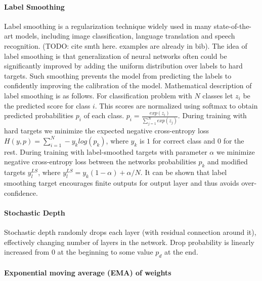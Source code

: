 

\paragraph{Label Smoothing}

Label smoothing is a regularization technique widely used in many state-of-the-art models, including image classification, language translation and speech recognition. (TODO: cite smth here. examples are already in bib). The idea of label smoothing is that generalization of neural networks often could be significantly improved by adding the uniform distribution over labels to hard targets. Such smoothing prevents the model from predicting the labels to confidently improving the calibration of the model.  Mathematical description of label smoothing is as follows. For classification problem with $N$ classes let $z_i$ be the predicted score for class $i$. This scores are normalized using softmax to obtain predicted probabilities $p_i$ of each class. $p_i = \frac{exp(z_i)}{\sum_{j=1}^N exp(z_j)} $. During training with hard targets we minimize the expected negative cross-entropy loss $H(y, p) = \sum_{i=1}^N -y_k log(p_k)$, where $y_k$ is $1$ for correct class and $0$ for the rest. During training with label-smoothed targets with parameter $\alpha$ we minimize negative cross-entropy loss between the networks probabilities $p_k$ and modified targets  $y_l^{LS}$, where $y_l^{LS} = y_k (1 - \alpha ) + \alpha / N$. It can be shown \cite{he2019_bag_of_tricks} that label smoothing target encourages finite outputs for output layer and thus avoids over-confidence.


\paragraph{Stochastic Depth}

Stochastic depth \cite{huang2016_stochastic_depth} randomly drops each layer (with residual connection around it), effectively changing number of layers in the network. Drop probability is linearly increased from $0$ at the beginning to some value $p_d$ at the end.

\paragraph{Exponential moving average (EMA) of weights}

